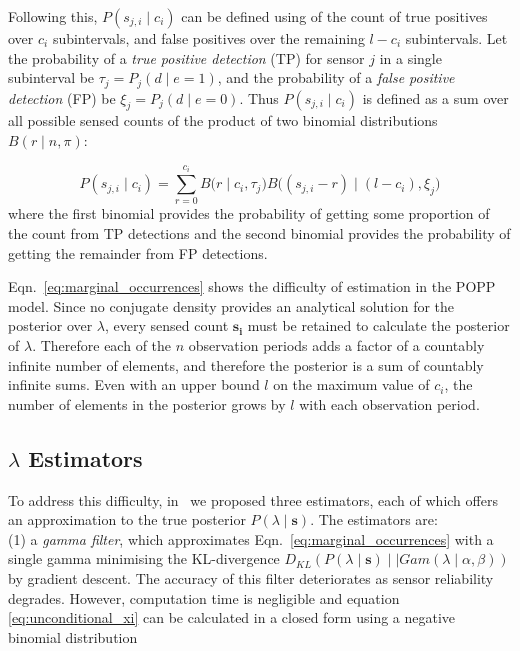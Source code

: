 Following this, $P(s_{j,i} \mid c_i)$ can be defined using of the count of true  positives over $c_i$ subintervals, and false positives over the remaining $l-c_i$ subintervals. 
% 
Let the probability of a \textit{true positive detection} (TP) for sensor $j$ in a single subinterval be $\tau_j=P_j(d \mid e{=}1)$, and the probability of a \textit{false positive detection} (FP) be $\xi_j = P_j(d \mid e{=}0)$. Thus $P(s_{j,i} \mid c_i)$ is defined as a sum over all possible sensed counts of the product of two binomial distributions $B(r \mid n,\pi)$: 

\begin{equation}
	\label{eq:joint_binomial_distribution}
    P(s_{j,i} \mid c_i) \! = \! \! \! \displaystyle\sum_{r = 0}^{c_{i}} \! \! B\Big(r \mid c_i, \tau_j\Big) B\Big((s_{j,i} - r) \mid (l - c_{i}), \xi_j \Big)
\end{equation}
\noindent where the first binomial provides the probability of getting some proportion of the count from  TP detections and the second binomial provides the probability of getting the remainder from FP detections. 


Eqn.~\ref{eq:marginal_occurrences} shows the difficulty of estimation in the POPP model. Since no conjugate density provides an analytical solution for the posterior over $\lambda$, every sensed count $\mathbf{s_i}$ must be retained to calculate the posterior of $\lambda$. Therefore each of the $n$ observation periods adds a factor of a countably infinite number of elements, and therefore the posterior is a sum of countably infinite sums. Even with an upper bound $l$ on the maximum value of $c_i$, the number of elements in the posterior grows by $l$ with each observation period.
% 
\subsection*{$\lambda$ Estimators}\label{sec:estimators}

To address this difficulty, in~\cite{jovan18a} we proposed three estimators, each of which offers an approximation to the true posterior $P(\lambda \mid \mathbf{s})$. The estimators are: \\
(1) a \textit{gamma filter}, which approximates Eqn.~\ref{eq:marginal_occurrences} with a single gamma minimising the KL-divergence $D_{KL}(P(\lambda \mid \mathbf{s}) \mid \mid Gam(\lambda \mid \alpha, \beta))$ by gradient descent. The accuracy of this filter deteriorates as sensor reliability degrades. However, computation time is negligible and equation \ref{eq:unconditional_xi} can be calculated in a closed form using a negative binomial distribution \\

